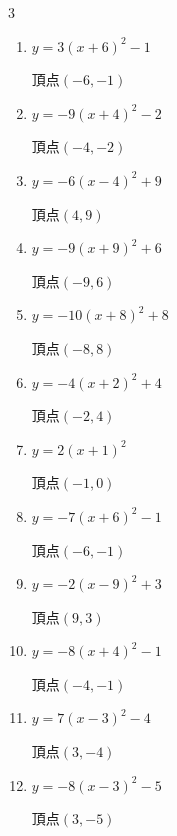 \begin{multicols}{3}
\begin{enumerate}
  \item $\displaystyle y=3\left( x+6\right)^{2}-1$

        $\displaystyle 頂点\left( -6 , -1 \right)$

  \item $\displaystyle y=-9\left( x+4\right)^{2}-2$

        $\displaystyle 頂点\left( -4 , -2 \right)$

  \item $\displaystyle y=-6\left( x-4\right)^{2}+9$

        $\displaystyle 頂点\left( 4 , 9 \right)$

  \item $\displaystyle y=-9\left( x+9\right)^{2}+6$

        $\displaystyle 頂点\left( -9 , 6 \right)$

  \item $\displaystyle y=-10\left( x+8\right)^{2}+8$

        $\displaystyle 頂点\left( -8 , 8 \right)$

  \item $\displaystyle y=-4\left( x+2\right)^{2}+4$

        $\displaystyle 頂点\left( -2 , 4 \right)$

  \item $\displaystyle y=2\left( x+1\right)^{2}$

        $\displaystyle 頂点\left( -1 , 0 \right)$

  \item $\displaystyle y=-7\left( x+6\right)^{2}-1$

        $\displaystyle 頂点\left( -6 , -1 \right)$

  \item $\displaystyle y=-2\left( x-9\right)^{2}+3$

        $\displaystyle 頂点\left( 9 , 3 \right)$

  \item $\displaystyle y=-8\left( x+4\right)^{2}-1$

        $\displaystyle 頂点\left( -4 , -1 \right)$

  \item $\displaystyle y=7\left( x-3\right)^{2}-4$

        $\displaystyle 頂点\left( 3 , -4 \right)$

  \item $\displaystyle y=-8\left( x-3\right)^{2}-5$

        $\displaystyle 頂点\left( 3 , -5 \right)$


\end{enumerate}
\end{multicols}
